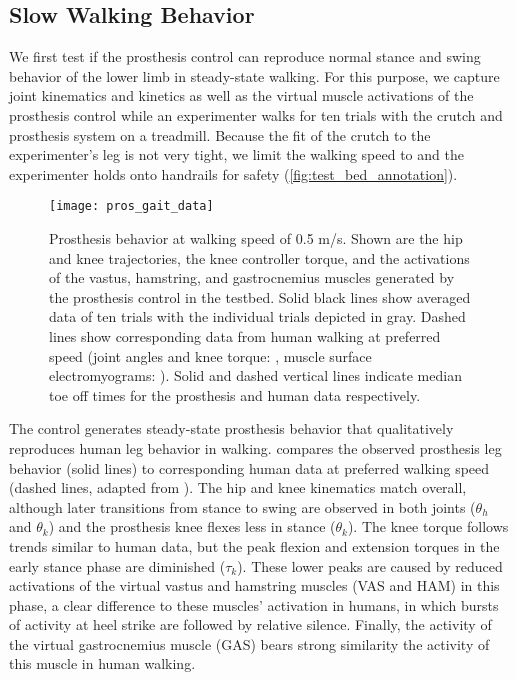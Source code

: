\subsection{Slow Walking Behavior}
We first test if the prosthesis control can reproduce normal stance and swing
behavior of the lower limb in steady-state walking. For this purpose, we capture
joint kinematics and kinetics as well as the virtual muscle activations of the
prosthesis control while an experimenter walks for ten trials with the crutch
and prosthesis system on a treadmill. Because the fit of the crutch to the
experimenter's leg is not very tight, we limit the walking speed to
 and the experimenter holds onto handrails for safety
(\cref{fig:test_bed_annotation}).
\begin{figure}[t]
    \centering
    \texttt{[image: pros\_gait\_data]}
    \caption{Prosthesis behavior at walking speed of 0.5 m/s. Shown are the hip
    and knee trajectories, the knee controller torque, and the activations of
    the vastus, hamstring, and gastrocnemius muscles generated by the
    prosthesis control in the testbed. Solid black lines show averaged data  of
    ten trials with the individual trials depicted in gray. Dashed lines show
    corresponding data from human walking at preferred speed (joint angles and
    knee torque: \citet{winter2009biomechanics}, muscle surface
    electromyograms: \citet{perry2010gait}). Solid and dashed vertical lines
    indicate median toe off times for the prosthesis and human data
    respectively.
    }\label{fig:pros_gait_data}
\end{figure}

The control generates steady-state prosthesis behavior that qualitatively
reproduces human leg behavior in walking.  compares the
observed prosthesis leg behavior (solid lines) to corresponding human data at
preferred walking speed (dashed lines, adapted from
\citet{winter2009biomechanics,perry2010gait}). The hip and knee kinematics match
overall, although later transitions from stance to swing are observed in both
joints ($\theta_h$ and $\theta_k$) and the prosthesis knee flexes less in stance
($\theta_k$). The knee torque follows trends similar to human data, but the peak
flexion and extension torques in the early stance phase are diminished
($\tau_k$). These lower peaks are caused by reduced activations of the virtual
vastus and hamstring muscles (VAS and HAM) in this phase, a clear difference to
these muscles' activation in humans, in which bursts of activity at heel strike
are followed by relative silence. Finally, the activity of the virtual
gastrocnemius muscle (GAS) bears strong similarity the activity of this muscle
in human walking.

